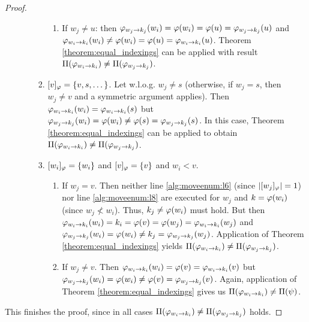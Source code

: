 \begin{proof}
\begin{enumerate}
\begin{enumerate}
\begin{enumerate}
\begin{enumerate}
                    \item If $w_j \neq u$: then $\varphi_{w_j\rightarrow k_j}(w_i) = \varphi(w_i) = \varphi(u) = \varphi_{w_j\rightarrow k_j}(u)$ and $\varphi_{w_i\rightarrow k_i}(w_i) \neq \varphi(w_i) = \varphi(u) = \varphi_{w_i\rightarrow k_i}(u)$. Theorem \ref{theorem:equal_indexings} can be applied with result $\Pi(\varphi_{w_i\rightarrow k_i}) \neq \Pi(\varphi_{w_j\rightarrow k_j})$.
                \end{enumerate}
                \item $[v]_{\varphi} = \{v,s,\dots\}$. Let w.l.o.g. $w_j \neq s$ (otherwise, if $w_j = s$, then $w_j \neq v$ and a symmetric argument applies). Then $\varphi_{w_i\rightarrow k_i}(w_i) = \varphi_{w_i\rightarrow k_i}(s)$ but $\varphi_{w_j\rightarrow k_j}(w_i) = \varphi(w_i) \neq  \varphi(s) = \varphi_{w_j\rightarrow k_j}(s)$. In this case, Theorem \ref{theorem:equal_indexings} can be applied to obtain $\Pi(\varphi_{w_i\rightarrow k_i}) \neq \Pi(\varphi_{w_j\rightarrow k_j})$.
                \item $[w_i]_\varphi = \{ w_i \}$ and $[v]_\varphi = \{ v \}$ and $w_i < v$.
                \begin{enumerate}
                    \item If $w_j = v$. Then neither line \ref{alg:moveenum:l6} (since $|[w_j]_\varphi| = 1$) nor line \ref{alg:moveenum:l8} are executed for $w_j$ and $k = \varphi(w_i)$ (since $w_j \not < w_i$). Thus, $k_j \neq \varphi(w_i)$ must hold. But then $\varphi_{w_i\rightarrow k_i}(w_i) = k_i = \varphi(v) = \varphi(w_j) = \varphi_{w_i\rightarrow k_i}(w_j)$ and $\varphi_{w_j\rightarrow k_j}(w_i) = \varphi(w_i) \neq k_j = \varphi_{w_j\rightarrow k_j}(w_j)$. Application of Theorem \ref{theorem:equal_indexings} yields $\Pi(\varphi_{w_i\rightarrow k_i}) \neq \Pi(\varphi_{w_j\rightarrow k_j})$.
                    \item If $w_j \neq v$. Then $\varphi_{w_i\rightarrow k_i}(w_i) = \varphi(v) = \varphi_{w_i\rightarrow k_i}(v)$ but $\varphi_{w_j\rightarrow k_j}(w_i) = \varphi(w_i) \neq \varphi(v) = \varphi_{w_j\rightarrow k_j}(v)$. Again, application of Theorem \ref{theorem:equal_indexings} gives us $\Pi(\varphi_{w_i\rightarrow k_i}) \neq \Pi(\psi)$.
                \end{enumerate} 
            \end{enumerate}
        \end{enumerate}
    \end{enumerate}
    This finishes the proof, since in all cases $\Pi(\varphi_{w_i\rightarrow k_i}) \neq \Pi(\varphi_{w_j\rightarrow k_j})$ holds.
\end{proof}

